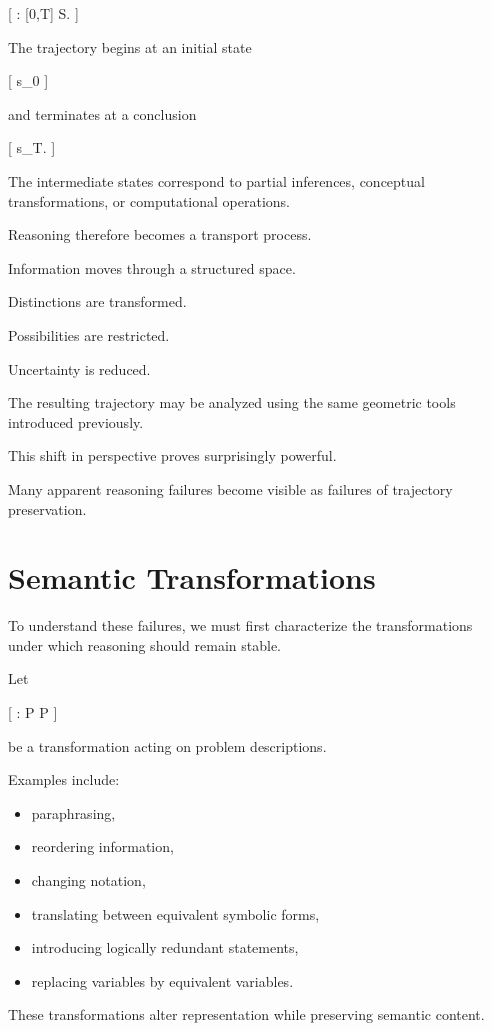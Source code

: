 \documentclass[11pt,oneside,openany]{book}
\begin{document}
[
\gamma
:
[0,T]
\rightarrow
\mathcal S.
]

The trajectory begins at an initial state

[
s_0
]

and terminates at a conclusion

[
s_T.
]

The intermediate states correspond to partial inferences, conceptual transformations, or computational operations.

Reasoning therefore becomes a transport process.

Information moves through a structured space.

Distinctions are transformed.

Possibilities are restricted.

Uncertainty is reduced.

The resulting trajectory may be analyzed using the same geometric tools introduced previously.

This shift in perspective proves surprisingly powerful.

Many apparent reasoning failures become visible as failures of trajectory preservation.

\section{Semantic Transformations}

To understand these failures, we must first characterize the transformations under which reasoning should remain stable.

Let

[
\tau
:
\mathcal P
\rightarrow
\mathcal P
]

be a transformation acting on problem descriptions.

Examples include:

\begin{itemize}
\item paraphrasing,
\item reordering information,
\item changing notation,
\item translating between equivalent symbolic forms,
\item introducing logically redundant statements,
\item replacing variables by equivalent variables.
\end{itemize}

These transformations alter representation while preserving semantic content.
\end{document}
